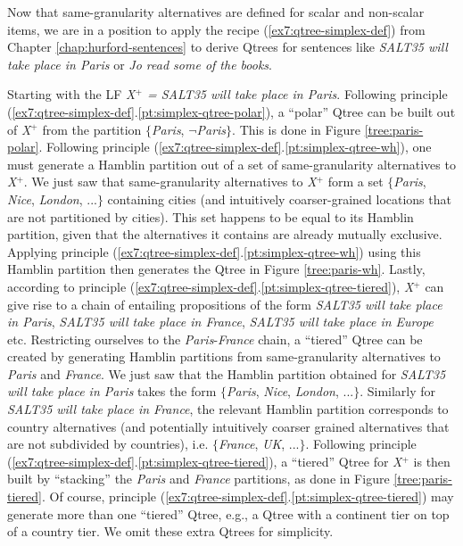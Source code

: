 Now that same-granularity alternatives are defined for scalar and non-scalar items, we are in a position to apply the recipe (\ref{ex7:qtree-simplex-def}) from Chapter \ref{chap:hurford-sentences} to derive Qtrees for sentences like \textit{SALT35 will take place in Paris} or \textit{Jo read some of the books}.

Starting with the LF \textit{X$^+$ = SALT35 will take place in Paris}. Following principle (\ref{ex7:qtree-simplex-def}.\ref{pt:simplex-qtree-polar}), a ``polar'' Qtree can be built out of \textit{X}$^+$ from the partition $\lbrace$\textit{Paris}, $\neg$\textit{Paris}$\rbrace$. This is done in Figure \ref{tree:paris-polar}. Following principle (\ref{ex7:qtree-simplex-def}.\ref{pt:simplex-qtree-wh}), one must generate a Hamblin partition out of a set of same-granularity alternatives to \textit{X}$^+$. We just saw that same-granularity alternatives to \textit{X}$^+$ form a set $\lbrace$\textit{Paris}, \textit{Nice}, \textit{London}, ...$\rbrace$ containing cities (and intuitively coarser-grained locations that are not partitioned by cities). This set happens to be equal to its Hamblin partition, given that the alternatives it contains are already mutually exclusive. Applying principle (\ref{ex7:qtree-simplex-def}.\ref{pt:simplex-qtree-wh}) using this Hamblin partition then generates the Qtree in Figure \ref{tree:paris-wh}. Lastly, according to principle (\ref{ex7:qtree-simplex-def}.\ref{pt:simplex-qtree-tiered}), \textit{X}$^+$ can give rise to a chain of entailing propositions of the form \textit{SALT35 will take place in Paris}, \textit{SALT35 will take place in France}, \textit{SALT35 will take place in Europe} etc. Restricting ourselves to the \textit{Paris}-\textit{France} chain, a ``tiered'' Qtree can be created by generating Hamblin partitions from same-granularity alternatives to \textit{Paris} and \textit{France}. We just saw that the Hamblin partition obtained for \textit{SALT35 will take place in Paris} takes the form $\lbrace$\textit{Paris}, \textit{Nice}, \textit{London}, ...$\rbrace$. Similarly for \textit{SALT35 will take place in France}, the relevant Hamblin partition corresponds to country alternatives (and potentially intuitively coarser grained alternatives that are not subdivided by countries), i.e. $\lbrace$\textit{France}, \textit{UK}, ...$\rbrace$. Following principle (\ref{ex7:qtree-simplex-def}.\ref{pt:simplex-qtree-tiered}), a ``tiered'' Qtree for \textit{X}$^+$ is then built by ``stacking'' the \textit{Paris} and \textit{France} partitions, as done in Figure \ref{tree:paris-tiered}. Of course, principle (\ref{ex7:qtree-simplex-def}.\ref{pt:simplex-qtree-tiered}) may generate more than one ``tiered'' Qtree, e.g., a Qtree with a continent tier on top of a country tier. We omit these extra Qtrees for simplicity.

